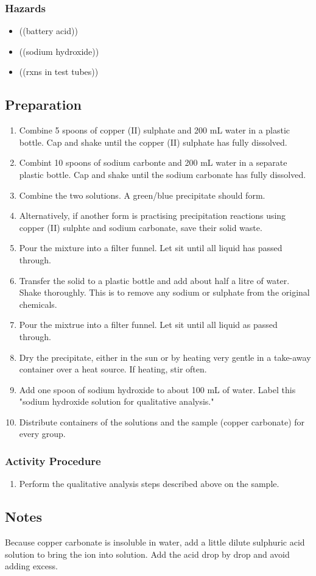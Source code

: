 \subsubsection{Hazards}
\begin{itemize}
\item{((battery acid))}
\item{((sodium hydroxide))}
\item{((rxns in test tubes))}
\end{itemize}

\subsection{Preparation}
\begin{enumerate}
\item{Combine 5 spoons of copper (II) sulphate and 200 mL water in a plastic bottle. Cap and shake until the copper (II) sulphate has fully dissolved.}
\item{Combint 10 spoons of sodium carbonte and 200 mL water in a separate plastic bottle. Cap and shake until the sodium carbonate has fully dissolved.}
\item{Combine the two solutions. A green/blue precipitate should form.}
\item{Alternatively, if another form is practising precipitation reactions using copper (II) sulphte and sodium carbonate, save their solid waste.}
\item{Pour the mixture into a filter funnel. Let sit until all liquid has passed through.}
\item{Transfer the solid to a plastic bottle and add about half a litre of water. Shake thoroughly. This is to remove any sodium or sulphate from the original chemicals.}
\item{Pour the mixtrue into a filter funnel. Let sit until all liquid as passed through.}
\item{Dry the precipitate, either in the sun or by heating very gentle in a take-away container over a heat source. If heating, stir often.}
\item{Add one spoon of sodium hydroxide to about 100 mL of water. Label this 
"sodium hydroxide solution for qualitative analysis."}
\item{Distribute containers of the solutions and the sample (copper carbonate) for every group.}
\end{enumerate}

\subsubsection{Activity Procedure}
\begin{enumerate}
\item{Perform the qualitative analysis steps described above on the sample.}
\end{enumerate}

\subsection{Notes}
Because copper carbonate is insoluble in water, add a little dilute sulphuric acid solution to bring the ion into solution. Add the acid drop by drop and avoid adding excess.